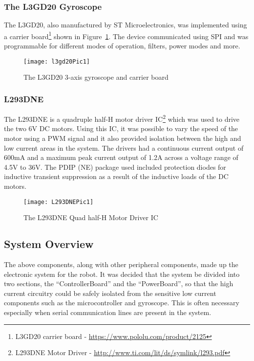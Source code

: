     \subsubsection{The L3GD20 Gyroscope}
    \label{subs:The L3GD20 Gyroscope}
      The L3GD20, also manufactured by ST Microelectronics, was implemented using a carrier board\footnote{L3GD20 carrier board - \url{https://www.pololu.com/product/2125}} shown in Figure~\ref{fig:l3gd20Pic1}. The device communicated using SPI and was programmable for different modes of operation, filters, power modes and more.

      \begin{figure}[H]
        \begin{center}
          \texttt{[image: l3gd20Pic1]}
          \caption{The L3GD20 3-axis gyroscope and carrier board}
          \label{fig:l3gd20Pic1}
        \end{center}
      \end{figure}

    \subsubsection{L293DNE}
    \label{subs:L293DNE}
      The L293DNE is a quadruple half-H motor driver IC\footnote{L293DNE Motor Driver - \url{http://www.ti.com/lit/ds/symlink/l293.pdf}} which was used to drive the two 6V DC motors. Using this IC, it was possible to vary the speed of the motor using a PWM signal and it also provided isolation between the high and low current areas in the system. The drivers had a continuous current output of 600mA and a maximum peak current output of 1.2A across a voltage range of 4.5V to 36V. The PDIP (NE) package used included protection diodes for inductive transient suppression as a result of the inductive loads of the DC motors.

      \begin{figure}[H]
        \begin{center}
          \texttt{[image: L293DNEPic1]}
          \caption{The L293DNE Quad half-H Motor Driver IC}
          \label{fig:L293DNEPic1}
        \end{center}
      \end{figure}


  \subsection{System Overview}
  \label{sub:System Overview}
    The above components, along with other peripheral components, made up the electronic system for the robot. It was decided that the system be divided into two sections, the ``ControllerBoard'' and the ``PowerBoard'', so that the high current circuitry could be safely isolated from the sensitive low current components such as the microcontroller and gyroscope. This is often necessary especially when serial communication lines are present in the system.\\


